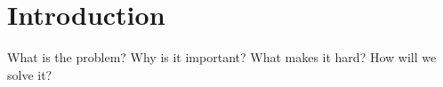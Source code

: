 \section{Introduction}

What is the problem?
Why is it important?
What makes it hard?
How will we solve it?
